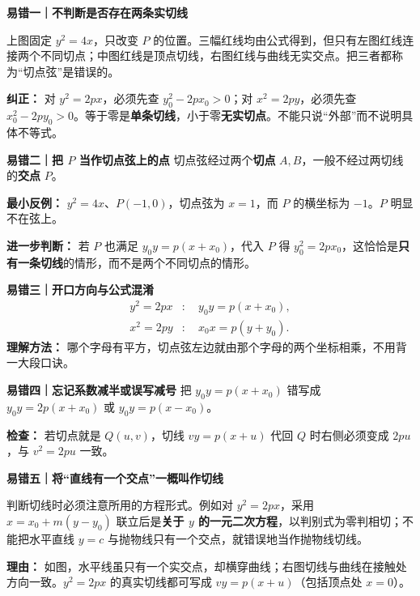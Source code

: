 \begin{trapbox}
\textbf{\textcolor{CTrap}{易错一｜不判断是否存在两条实切线}}
\par\smallskip\begin{center}\end{center}\par\smallskip

上图固定 $y^2=4x$，只改变 $P$ 的位置。三幅红线均由公式得到，但只有左图红线连接两个不同切点；中图红线是顶点切线，右图红线与曲线无实交点。把三者都称为“切点弦”是错误的。
\par\textbf{纠正：} 对 $y^2=2px$，必须先查 $y_0^2-2px_0>0$；对 $x^2=2py$，必须先查 $x_0^2-2py_0>0$。等于零是\textbf{单条切线}，小于零\textbf{无实切点}。不能只说“外部”而不说明具体不等式。

\medskip
\textbf{\textcolor{CTrap}{易错二｜把 $P$ 当作切点弦上的点}}
切点弦经过两个\textbf{切点} $A,B$，一般不经过两切线的\textbf{交点} $P$。
\par\textbf{最小反例：} $y^2=4x$、$P(-1,0)$，切点弦为 $x=1$，而 $P$ 的横坐标为 $-1$。$P$ 明显不在弦上。
\par\textbf{进一步判断：} 若 $P$ 也满足 $y_0y=p(x+x_0)$，代入 $P$ 得 $y_0^2=2px_0$，这恰恰是\textbf{只有一条切线}的情形，而不是两个不同切点的情形。

\medskip
\textbf{\textcolor{CTrap}{易错三｜开口方向与公式混淆}}
\[
\begin{aligned}
 y^2=2px &:\quad \boxed{y_0y=p(x+x_0)},\\
 x^2=2py &:\quad \boxed{x_0x=p(y+y_0)}.
\end{aligned}
\]
\textbf{理解方法：} 哪个字母有平方，切点弦左边就由那个字母的两个坐标相乘，不用背一大段口诀。

\medskip
\textbf{\textcolor{CTrap}{易错四｜忘记系数减半或误写减号}}
把 $y_0y=p(x+x_0)$ 错写成 $y_0y=2p(x+x_0)$ 或 $y_0y=p(x-x_0)$。
\par\textbf{检查：} 若切点就是 $Q(u,v)$，切线 $vy=p(x+u)$ 代回 $Q$ 时右侧必须变成 $2pu$，与 $v^2=2pu$ 一致。

\medskip
\par\noindent\begin{minipage}{\linewidth}
\textbf{\textcolor{CTrap}{易错五｜将“直线有一个交点”一概叫作切线}}
\begin{center}\end{center}\end{minipage}\par
判断切线时必须注意所用的方程形式。例如对 $y^2=2px$，采用 $x=x_0+m(y-y_0)$ 联立后是\textbf{关于 $y$ 的一元二次方程}，以判别式为零判相切；不能把水平直线 $y=c$ 与抛物线只有一个交点，就错误地当作抛物线切线。
\par\textbf{理由：} 如图，水平线虽只有一个实交点，却横穿曲线；右图切线与曲线在接触处方向一致。$y^2=2px$ 的真实切线都可写成 $vy=p(x+u)$（包括顶点处 $x=0$）。


\end{trapbox}
